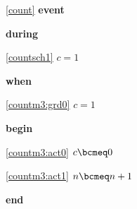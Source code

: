 \noindent \ref{count}  \textbf{event}
\begin{block}
  \item   \textbf{during}
  \begin{block}
  \item[ \eqref{countsch1} ]{$c = 1$} %
  \end{block}
  \item   \textbf{when}
  \begin{block}
  \item[ \eqref{countm3:grd0} ]{$c = 1$} %
  \end{block}
  \item   \textbf{begin}
  \begin{block}
  \item[ \eqref{countm3:act0} ]{$c \bcmeq 0$} %
  \item[ \eqref{countm3:act1} ]{$n \bcmeq n+1$} %
  \end{block}
  \item   \textbf{end} \\
\end{block}
